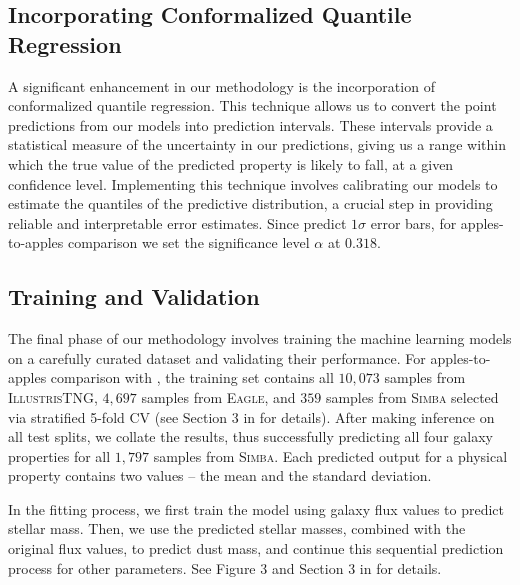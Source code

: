 \documentclass[letterpaper]{article} %
\begin{document}
\subsection{Incorporating Conformalized Quantile Regression}
A significant enhancement in our methodology is the incorporation of conformalized quantile regression. This technique allows us to convert the point predictions from our models into prediction intervals. These intervals provide a statistical measure of the uncertainty in our predictions, giving us a range within which the true value of the predicted property is likely to fall, at a given confidence level. Implementing this technique involves calibrating our models to estimate the quantiles of the predictive distribution, a crucial step in providing reliable and interpretable error estimates. Since \cite{Gilda21} predict $1 \sigma$ error bars, for apples-to-apples comparison we set the significance level $\alpha$ at $0.318$.

\subsection{Training and Validation}
The final phase of our methodology involves training the machine learning models on a carefully curated dataset and validating their performance. For apples-to-apples comparison with \cite{Gilda21}, the training set contains all $10,073$ samples from \textsc{IllustrisTNG}, $4,697$ samples from \textsc{Eagle}, and $359$ samples from \textsc{Simba} selected via stratified 5-fold CV (see Section 3 in \citet{Gilda21} for details). After making inference on all test splits, we collate the results, thus successfully predicting all four galaxy properties for all $1,797$ samples from \textsc{Simba}. Each predicted output for a physical property contains two values -- the mean and the standard deviation.

In the fitting process, we first train the model using galaxy flux values to predict stellar mass. Then, we use the predicted stellar masses, combined with the original flux values, to predict dust mass, and continue this sequential prediction process for other parameters. See Figure 3 and Section 3 in \citet{Gilda21} for details.
\end{document}
